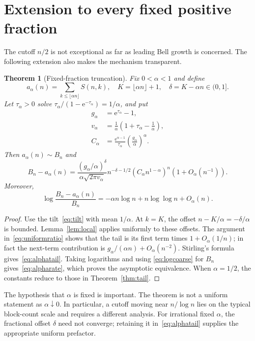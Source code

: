 \documentclass[11pt,a4paper]{article}
\numberwithin{equation}{section}
\newtheorem{theorem}{Theorem}[section]
\theoremstyle{remark}
\newcommand{\e}{\mathrm e}
\begin{document}
\section{Extension to every fixed positive fraction}\label{sec:alpha}

The cutoff $n/2$ is not exceptional as far as leading Bell growth is
concerned. The following extension also makes the mechanism transparent.

\begin{theorem}[Fixed-fraction truncation]\label{thm:alpha}
Fix $0<\alpha<1$ and define
\[
 a_\alpha(n)=\sum_{k\le\lfloor\alpha n\rfloor}S(n,k),\quad
 K=\lfloor\alpha n\rfloor+1,\quad \delta=K-\alpha n\in(0,1].
\]
Let $\tau_\alpha>0$ solve
$\tau_\alpha/(1-\e^{-\tau_\alpha})=1/\alpha$, and put
\begin{align*}
 g_\alpha&=\e^{\tau_\alpha}-1,\\
 v_\alpha&=\frac1\alpha\left(1+\tau_\alpha-\frac1\alpha\right),\\
 C_\alpha&=\frac{\e^{\alpha-1}}{\tau_\alpha}
                 \left(\frac{g_\alpha}{\alpha}\right)^\alpha.
\end{align*}
Then $a_\alpha(n)\sim B_n$ and
\begin{equation}\label{eq:alphatail}
 B_n-a_\alpha(n)=
 \frac{(g_\alpha/\alpha)^\delta}{\alpha\sqrt{2\pi v_\alpha}}
 n^{-\delta-1/2}
 \left(C_\alpha n^{1-\alpha}\right)^n
 \left(1+O_\alpha(n^{-1})\right).
\end{equation}
Moreover,
\begin{equation}\label{eq:alpharate}
 \log\frac{B_n-a_\alpha(n)}{B_n}
 =-\alpha n\log n+n\log\log n+O_\alpha(n).
\end{equation}
\end{theorem}
\begin{proof}
Use the tilt~\eqref{eq:tilt} with mean $1/\alpha$. At $k=K$, the offset
$n-K/\alpha=-\delta/\alpha$ is bounded. Lemma~\ref{lem:local} applies
uniformly to these offsets. The argument in~\eqref{eq:uniformratio}
shows that the tail is its first term times $1+O_\alpha(1/n)$;
in fact the next-term contribution is
$g_\alpha/(\alpha n)+O_\alpha(n^{-2})$.
Stirling's formula gives~\eqref{eq:alphatail}. Taking logarithms and using
\eqref{eq:logcoarse} for $B_n$ gives~\eqref{eq:alpharate}, which proves the
asymptotic equivalence. When $\alpha=1/2$, the constants reduce to those
in Theorem~\ref{thm:tail}.
\end{proof}

The hypothesis that $\alpha$ is fixed is important. The theorem is not a
uniform statement as $\alpha\downarrow0$. In particular, a cutoff moving
near $n/\log n$ lies on the typical block-count scale and requires a
different analysis. For irrational fixed $\alpha$, the fractional offset
$\delta$ need not converge; retaining it in~\eqref{eq:alphatail} supplies
the appropriate uniform prefactor.
\end{document}
